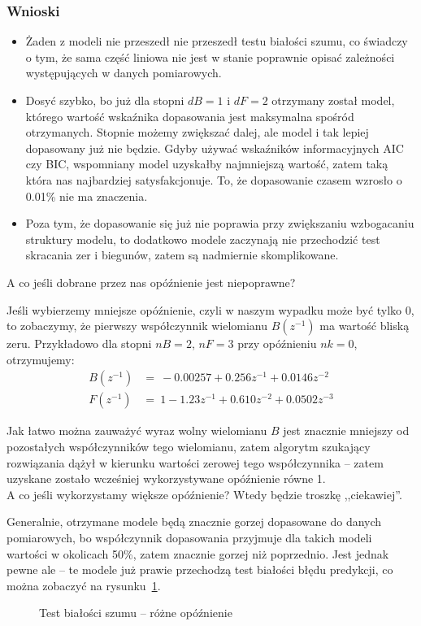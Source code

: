 \documentclass[11pt, a4paper]{article}
\begin{document}
\newpage

\subsubsection*{Wnioski}

\begin{itemize}
\item Żaden z modeli nie przeszedł nie przeszedł testu białości szumu, co świadczy o tym, że sama część liniowa nie jest w stanie poprawnie opisać zależności występujących w danych pomiarowych.
\item Dosyć szybko, bo już dla stopni $dB = 1$ i $dF = 2$ otrzymany został model, którego wartość wskaźnika dopasowania jest maksymalna spośród otrzymanych. Stopnie możemy zwiększać dalej, ale model i tak lepiej dopasowany już nie będzie. Gdyby używać wskaźników informacyjnych AIC czy BIC, wspomniany model uzyskałby najmniejszą wartość, zatem taką która nas najbardziej satysfakcjonuje. To, że dopasowanie czasem wzrosło o 0.01\% nie ma znaczenia.
\item Poza tym, że dopasowanie się już nie poprawia przy zwiększaniu wzbogacaniu struktury modelu, to dodatkowo modele zaczynają nie przechodzić test skracania zer i biegunów, zatem są nadmiernie skomplikowane.
\end{itemize}

A co jeśli dobrane przez nas opóźnienie jest niepoprawne?

Jeśli wybierzemy mniejsze opóźnienie, czyli w naszym wypadku może być tylko 0, to zobaczymy, że pierwszy współczynnik wielomianu $B(z^{-1})$ ma wartość bliską zeru. Przykładowo dla stopni $nB = 2$, $nF = 3$ przy opóźnieniu $nk = 0$, otrzymujemy:
\begin{align*}
B(z^{-1}) &= \ -0.00257 + 0.256 z^{-1} + 0.0146 z^{-2} \\
F(z^{-1}) &= \ 1 - 1.23 z^{-1} + 0.610 z^{-2} + 0.0502 z^{-3}
\end{align*}

Jak łatwo można zauważyć wyraz wolny wielomianu $B$ jest znacznie mniejszy od pozostałych współczynników tego wielomianu, zatem algorytm szukający rozwiązania dążył w kierunku wartości zerowej tego współczynnika -- zatem uzyskane zostało wcześniej wykorzystywane opóźnienie równe 1.\\

A co jeśli wykorzystamy większe opóźnienie? Wtedy będzie troszkę ,,ciekawiej''.

Generalnie, otrzymane modele będą znacznie gorzej dopasowane do danych pomiarowych, bo współczynnik dopasowania przyjmuje dla takich modeli wartości w okolicach 50\%, zatem znacznie gorzej niż poprzednio. Jest jednak pewne ale -- te modele już prawie przechodzą test białości błędu predykcji, co można zobaczyć na rysunku~\ref{fig:bialy}.
\begin{figure}[htbp!]
	\centering
	\hfill%
	\caption{Test białości szumu -- różne opóźnienie}
	\label{fig:bialy}
\end{figure}
\end{document}
